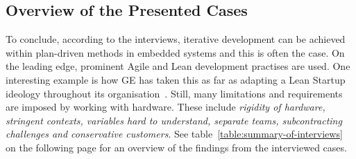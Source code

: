\documentclass[english]{tktltiki2}
\begin{document}
\subsection{Overview of the Presented Cases}

To conclude, according to the interviews, iterative development can be achieved within plan-driven methods in embedded systems and this is often the case. On the leading edge, prominent Agile and Lean development practises are used. One interesting example is how GE has taken this as far as adapting a Lean Startup ideology throughout its organisation~\cite{BT15}. Still, many limitations and requirements are imposed by working with hardware. These include \emph{rigidity of hardware, stringent contexts, variables hard to understand, separate teams, subcontracting challenges and conservative customers}. See table~\ref{table:summary-of-interviews} on the following page for an overview of the findings from the interviewed cases.

\end{document}
